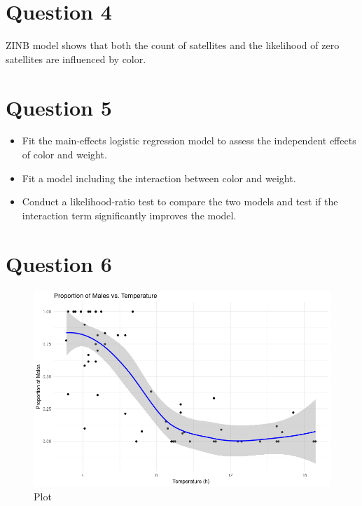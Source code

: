 \documentclass{article}
\begin{document}
\section*{Question 4 }


ZINB model shows that both the count of satellites and the likelihood of zero satellites are influenced by color.




\section*{Question 5 }


\begin{itemize}
    \item Fit the main-effects logistic regression model to assess the independent effects of color and weight.
     \item Fit a model including the interaction between color and weight.

     \item
Conduct a likelihood-ratio test to compare the two models and test if the interaction term significantly improves the model.

\end{itemize}


\section*{Question 6 }



\begin{figure}[H] %
  \centering
  \includegraphics[width=\textwidth]{cluster_01.png}
  \caption{Plot}
  \label{fig:enter-label}
\end{figure}
\end{document}
